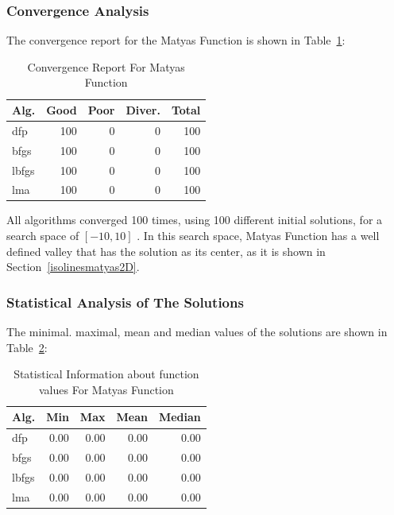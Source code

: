 \documentclass[conference]{IEEEtran}
\begin{document}
\subsubsection{Convergence Analysis}
\label{convergencematyas2D}


The convergence report for the Matyas Function is shown in Table~\ref{convergence:matyas}:

\begin{table}[H]
\centering
\caption{Convergence Report For Matyas Function}
\label{convergence:matyas}
\begin{tabular}{lrrrr}
\toprule
 Alg. &  Good &  Poor &  Diver. &  Total \\
\midrule
  dfp &   100 &     0 &       0 &    100 \\
 bfgs &   100 &     0 &       0 &    100 \\
lbfgs &   100 &     0 &       0 &    100 \\
  lma &   100 &     0 &       0 &    100 \\
\bottomrule
\end{tabular}
\end{table}

All algorithms converged 100 times, using 100 different initial solutions,
for a search space of $\left[-10, 10\right]$ . In this search space,
Matyas Function has a well defined valley that has the solution as its
center, as it is shown in Section~\ref{isolinesmatyas2D}.

\subsubsection{Statistical Analysis of The Solutions}
\label{statisticalanalysismatyas2D}


The minimal. maximal, mean and median values of the solutions are shown in Table~\ref{function_values:matyas}:

\begin{table}[H]
\centering
\caption{Statistical Information about function values For Matyas Function}
\label{function_values:matyas}
\begin{tabular}{lrrrr}
\toprule
 Alg. &  Min &  Max &  Mean &  Median \\
\midrule
  dfp & 0.00 & 0.00 &  0.00 &    0.00 \\
 bfgs & 0.00 & 0.00 &  0.00 &    0.00 \\
lbfgs & 0.00 & 0.00 &  0.00 &    0.00 \\
  lma & 0.00 & 0.00 &  0.00 &    0.00 \\
\bottomrule
\end{tabular}
\end{table}
\end{document}
